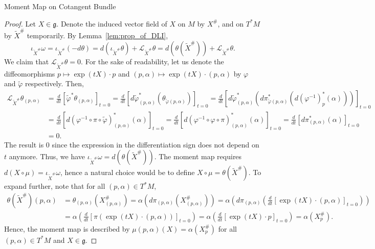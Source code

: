 \documentclass[b5paper,final]{article}
\newcommand{\ind}[1]{#1^\#}
\newcommand{\lied}[1]{\mathcal{L}_{#1}}
\newcommand{\intd}[1]{\iota_{#1}}
\begin{document}
\begin{proposition}{Moment Map on Cotangent Bundle}
\begin{proof}
        Let $X \in \mathfrak{g}$. Denote the induced vector field of $X$ on $M$ by $\ind{X}$, and on $T^*M$ by $\ind{\tilde{X}}$ temporarily. By Lemma~\ref{lem:prop_of_DLI},
        \begin{equation*}
            \intd{\ind{\tilde{X}}}\omega = \intd{\ind{\tilde{X}}} (-d\theta) = d(\intd{\ind{\tilde{X}}}\theta) + \lied{\ind{\tilde{X}}}\theta = d(\theta(\ind{\tilde{X}})) + \lied{\ind{\tilde{X}}}\theta.
        \end{equation*}
        We claim that $\lied{\ind{\tilde{X}}}\theta=0$. For the sake of readability, let us denote the diffeomorphisms $p \mapsto \exp(tX) \cdot p$ and $(p, \alpha) \mapsto \exp(tX) \cdot (p, \alpha)$ by $\varphi$ and $\tilde{\varphi}$ respectively. Then,
        \begin{align*}
            \lied{\ind{\tilde{X}}}\theta_{(p, \alpha)} &= \frac{d}{dt} \left[\tilde{\varphi}^*\theta_{(p, \alpha)}\right]_{t=0} = \frac{d}{dt} \left[d\tilde{\varphi}_{(p, \alpha)}^*(\theta_{\tilde{\varphi}(p, \alpha)})\right]_{t=0} = \frac{d}{dt} \left[d\tilde{\varphi}_{(p, \alpha)}^*(d\pi_{\tilde{\varphi}(p, \alpha)}^*(d(\varphi^{-1})_p^*(\alpha)))\right]_{t=0} \\
            &= \frac{d}{dt} \left[d(\varphi^{-1} \circ \pi \circ \tilde{\varphi})_{(p, \alpha)}^*(\alpha)\right]_{t=0} = \frac{d}{dt} \left[d(\varphi^{-1} \circ \varphi \circ \pi)_{(p, \alpha)}^*(\alpha)\right]_{t=0} = \frac{d}{dt} \left[d\pi_{(p, \alpha)}^*(\alpha)\right]_{t=0} \\
            &= 0.
        \end{align*}
        The result is 0 since the expression in the differentiation sign does not depend on $t$ anymore. Thus, we have $\intd{\ind{\tilde{X}}}\omega = d(\theta(\ind{\tilde{X}}))$. The moment map requires $d(X \circ \mu) = \intd{\ind{\tilde{X}}}\omega$, hence a natural choice would be to define $X \circ \mu = \theta(\ind{\tilde{X}})$. To expand further, note that for all $(p, \alpha) \in T^*M$,
        \begin{align*}
            \theta(\ind{\tilde{X}})(p, \alpha) &= \theta_{(p, \alpha)}(\ind{X}_{(p, \alpha)}) = \alpha(d\pi_{(p, \alpha)}(\ind{X}_{(p, \alpha)})) = \alpha \left( d\pi_{(p, \alpha)} \left( \frac{d}{dt} [\exp(tX) \cdot (p, \alpha)]_{t=0} \right) \right) \\
            &= \alpha \left( \frac{d}{dt} [\pi(\exp(tX) \cdot (p, \alpha))]_{t=0} \right) = \alpha \left( \frac{d}{dt} [\exp(tX) \cdot p]_{t=0} \right) = \alpha(\ind{X}_p).
        \end{align*}
        Hence, the moment map is described by $\mu(p, \alpha)(X) = \alpha(\ind{X}_p)$ for all $(p, \alpha) \in T^*M$ and $X \in \mathfrak{g}$.
    \end{proof}
\end{proposition}
\end{document}
